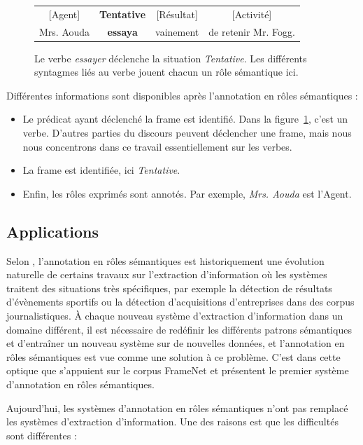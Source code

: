 \begin{figure}[ht]
    \centering
    \begin{tabular}{cccc}
    [Agent]  & \textbf{Tentative} & [Résultat]  & [Activité]         \tabularnewline
    Mrs. Aouda & \textbf{essaya}  & vainement & de retenir Mr. Fogg. \tabularnewline
    \end{tabular}
    \caption{\label{fig:introsrl}Le verbe \emph{essayer} déclenche la situation \emph{Tentative}.
    Les différents syntagmes liés au verbe jouent chacun un rôle sémantique ici.}
\end{figure}

Différentes informations sont disponibles après l'annotation en rôles
sémantiques :

\begin{itemize}
    \item Le prédicat ayant déclenché la frame est identifié. Dans la
        figure~\ref{fig:introsrl}, c'est un verbe. D'autres parties du
        discours peuvent déclencher une frame, mais nous nous concentrons dans
        ce travail essentiellement sur les verbes.
    \item La frame est identifiée, ici \emph{Tentative}.
    \item Enfin, les rôles exprimés sont annotés. Par exemple, \emph{Mrs.
        Aouda} est l'Agent.
\end{itemize}

\subsection{Applications}

Selon \cite{gildea2002automatic}, l'annotation en rôles sémantiques est
historiquement une évolution naturelle de certains travaux sur l'extraction
d'information où les systèmes traitent des situations très spécifiques, par
exemple la détection de résultats d'évènements sportifs ou la détection
d'acquisitions d'entreprises dans des corpus journalistiques. À chaque nouveau
système d'extraction d'information dans un domaine différent, il est nécessaire
de redéfinir les différents patrons sémantiques et d'entraîner un nouveau
système sur de nouvelles données, et l'annotation en rôles sémantiques est vue
comme une solution à ce problème. C'est dans cette optique que
\cite{gildea2002automatic} s'appuient sur le corpus FrameNet et présentent le
premier système d'annotation en rôles sémantiques.

Aujourd'hui, les systèmes d'annotation en rôles sémantiques n'ont pas remplacé
les systèmes d'extraction d'information. Une des raisons est que les
difficultés sont différentes \citep{boros2014etiquetage} :

